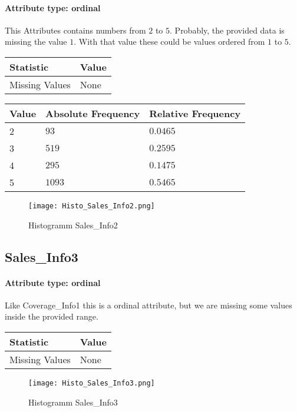 \paragraph{Attribute type: ordinal} This Attributes contains numbers from $2$ to $5$. Probably, the provided data is missing the value $1$. With that value these could be values ordered from $1$ to $5$.
\qquad
\begin{table}[H]
	\renewcommand{\arraystretch}{1.25}
	\begin{tabular}{l|l}
		\textbf{Statistic} & \textbf{Value}\\\hline
		Missing Values& None\\\hline
	\end{tabular}
\end{table}
\begin{table}[H]
	\renewcommand{\arraystretch}{1.25}
	\begin{tabular}{l|l|l}
		\textbf{Value} & \textbf{Absolute Frequency} & \textbf{Relative Frequency}\\\hline
		2&$93$&$0.0465$\\\hline
		3&$519$&$0.2595$\\\hline
		4&$295$&$0.1475$\\\hline
		5&$1093$&$0.5465$
	\end{tabular}
\end{table}
\begin{figure}[H]
	\begin{center}
		\texttt{[image: Histo\_Sales\_Info2.png]}
	\end{center}
	\caption{Histogramm Sales\_Info2}
\end{figure}

\subsection{Sales\_Info3}
\paragraph{Attribute type: ordinal} Like Coverage\_Info1 this is a ordinal attribute, but we are missing some values inside the provided range.

\qquad
\begin{table}[H]
	\renewcommand{\arraystretch}{1.25}
	\begin{tabular}{l|l}
		\textbf{Statistic} & \textbf{Value}\\\hline
		Missing Values& None\\\hline
	\end{tabular}
\end{table}
\begin{figure}[H]
	\begin{center}
		\texttt{[image: Histo\_Sales\_Info3.png]}
	\end{center}
	\caption{Histogramm Sales\_Info3}
\end{figure}

